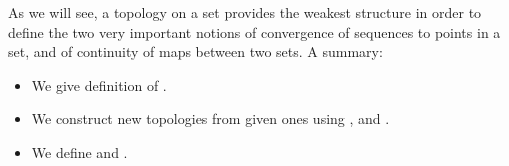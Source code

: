\documentclass{article}
\begin{document}
As we will see, a topology on a set provides the weakest structure in order to define the two very important notions of convergence of sequences to points in a set, and of continuity of maps between two sets. 
A summary:
\begin{itemize}[$\blacktriangleright$]
\item We give definition of .
\item We construct new topologies from given ones using ,  and .
\item We define  and .
\end{itemize}
\end{document}
